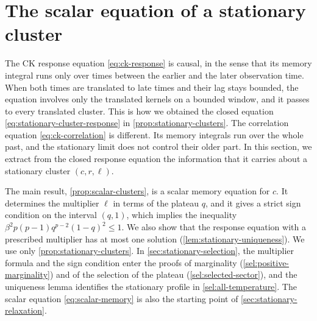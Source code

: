 \chapter{The scalar equation of a stationary cluster}\label{sec:scalar}

The CK response equation \eqref{eq:ck-response} is causal, in the sense that its memory integral runs only over times between the earlier and the later observation time. When both times are translated to late times and their lag stays bounded, the equation involves only the translated kernels on a bounded window, and it passes to every translated cluster. This is how we obtained the closed equation \eqref{eq:stationary-cluster-response} in \cref{prop:stationary-clusters}. The correlation equation \eqref{eq:ck-correlation} is different. Its memory integrals run over the whole past, and the stationary limit does not control their older part. In this section, we extract from the closed response equation the information that it carries about a stationary cluster $(c,r,\ell)$.

The main result, \cref{prop:scalar-clusters}, is a scalar memory equation for $c$. It determines the multiplier $\ell$ in terms of the plateau $q$, and it gives a strict sign condition on the interval $(q,1)$, which implies the inequality $\beta^2p(p-1)q^{p-2}(1-q)^2\le1$. We also show that the response equation with a prescribed multiplier has at most one solution (\cref{lem:stationary-uniqueness}). We use only \cref{prop:stationary-clusters}. In \cref{sec:stationary-selection}, the multiplier formula and the sign condition enter the proofs of marginality (\cref{sel:positive-marginality}) and of the selection of the plateau (\cref{sel:selected-sector}), and the uniqueness lemma identifies the stationary profile in \cref{sel:all-temperature}. The scalar equation \eqref{eq:scalar-memory} is also the starting point of \cref{sec:stationary-relaxation}.

